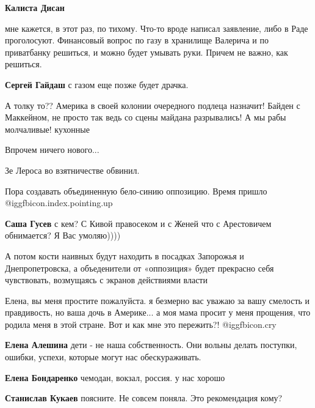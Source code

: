 \begin{itemize}
\begin{itemize}
\textbf{Калиста Дисан} 

мне кажется, в этот раз, по тихому. Что-то вроде написал заявление, либо в Раде
проголосуют. Финансовый вопрос по газу в хранилище Валерича и по приватбанку
решиться, и можно будет умывать руки. Причем не важно, как решиться.

\textbf{Сергей Гайдаш} с газом еще позже будет драчка.

\end{itemize} %


А толку то?? Америка в своей колонии очередного подлеца назначит! Байден с
Маккейном, не просто так ведь со сцены майдана разрывались! А мы рабы
молчаливые! кухонные

Впрочем ничего нового...

Зе Лероса во взятничестве обвинил.

Пора создавать объединенную бело-синию оппозицию. Время пришло @igg{fbicon.index.pointing.up}

\begin{itemize} %
\textbf{Саша Гусев} с кем? С Кивой правосеком и с Женей что с Арестовичем обнимается?
Я Вас умоляю))))


А потом кости наивных будут находить в посадках Запорожья и Днепропетровска, а
объеденители от «оппозиция» будет прекрасно себя чувствовать, возмущаясь с
экранов действиями власти

\end{itemize} %


Елена, вы меня простите пожалуйста. я безмерно вас уважаю за вашу смелость и
правдивость, но ваша дочь в Америке... а моя мама просит у меня прощения, что
родила меня в этой стране. Вот и как мне это пережить?! @igg{fbicon.cry} 

\begin{itemize} %
\textbf{Елена Алешина} дети - не наша собственность. Они вольны делать поступки, ошибки, успехи, которые могут нас обескураживать.

\textbf{Елена Бондаренко} чемодан, вокзал, россия. у нас хорошо

\textbf{Станислав Кукаев} поясните. Не совсем поняла. Это рекомендация кому?


\end{itemize}
\end{itemize}

